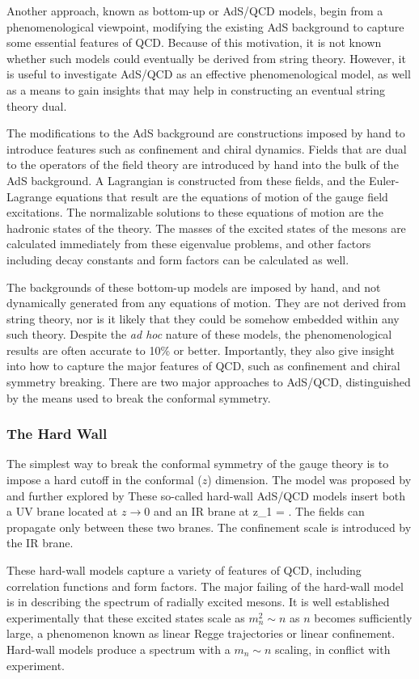 Another approach, known as bottom-up or AdS/QCD models, begin from a phenomenological viewpoint, modifying the existing AdS background to capture some essential features of QCD.
Because of this motivation, it is not known whether such models could eventually be derived from string theory.
However, it is useful to investigate AdS/QCD as an effective phenomenological model, as well as a means to gain insights that may help in constructing an eventual string theory dual.
 
The modifications to the AdS background are constructions imposed by hand to introduce features such as confinement and chiral dynamics.
Fields that are dual to the operators of the field theory are introduced by hand into the bulk of the AdS background.
A Lagrangian is constructed from these fields, and the Euler-Lagrange equations that result are the equations of motion of the gauge field excitations.
The normalizable solutions to these equations of motion are the hadronic states of the theory.
The masses of the excited states of the mesons are calculated immediately from these eigenvalue problems, and other factors including decay constants and form factors can be calculated as well.

The backgrounds of these bottom-up models are imposed by hand, and not dynamically generated from any equations of motion.
They are not derived from string theory, nor is it likely that they could be somehow embedded within any such theory.
Despite the \emph{ad hoc} nature of these models, the phenomenological results are often accurate to 10\% or better.
Importantly, they also give insight into how to capture the major features of QCD, such as confinement and chiral symmetry breaking.
There are two major approaches to AdS/QCD, distinguished by the means used to break the conformal symmetry.

\subsubsection{The Hard Wall}
The simplest way to break the conformal symmetry of the gauge theory is to impose a hard cutoff in the conformal ($z$) dimension.
The model was proposed by \cite{FILL-IN} and further explored by \cite{FILL-IN}
These so-called hard-wall AdS/QCD models insert both a UV brane located at $z\rightarrow 0$ and an IR brane at 
\be
z_1 = .
\ee
The fields can propagate only between these two branes.
The confinement scale is introduced by the IR brane.

These hard-wall models capture a variety of features of QCD, including correlation functions and form factors.
The major failing of the hard-wall model is in describing the spectrum of radially excited mesons.
It is well established experimentally that these excited states scale as $m_n^2 \sim n$ as $n$ becomes sufficiently large, a phenomenon known as linear Regge trajectories or linear confinement.
Hard-wall models produce a spectrum with a $m_n \sim n$ scaling, in conflict with experiment.

